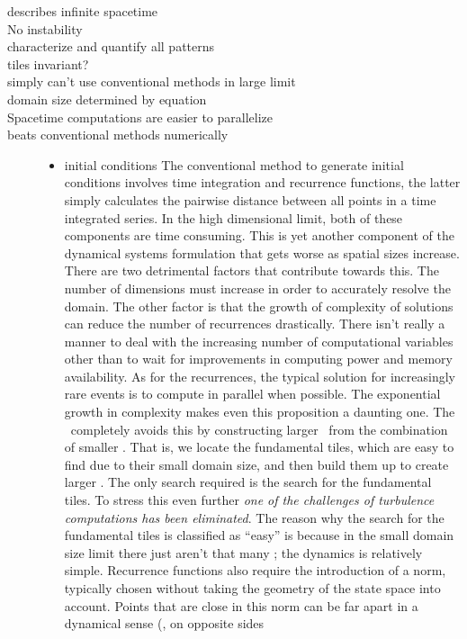 \begin{itemize}
{\begin{description}
\item[describes infinite spacetime]
\item[No instability]
\item[characterize and quantify all patterns]
\item[tiles invariant?]
\item[simply can't use conventional methods in large limit]
\item[domain size determined by equation]
\item[Spacetime computations are easier to parallelize]
\item[beats conventional methods numerically]
    \begin{itemize}
    \item initial conditions
    The conventional method to generate initial conditions
involves time integration and recurrence functions, the latter simply
calculates the pairwise distance between all points in a time integrated
series.%
In the high dimensional limit, both
of these components are time consuming. This is yet another
component of the dynamical systems formulation that gets worse
as spatial sizes increase. There are two detrimental factors
that contribute towards this. The number of dimensions must increase
in order to accurately resolve the domain. The other factor is that
the growth of complexity of solutions can reduce the number of recurrences
drastically. There isn't really a manner to deal with the increasing
number of computational variables other than to wait for improvements
in computing power and memory availability. As for the recurrences, the
typical solution for increasingly rare events is to compute in parallel when
possible. The exponential growth in complexity makes even this proposition
a daunting one.
The \spt\ completely avoids this by constructing larger \twots\
from the combination of smaller \twots. That is,
we locate the fundamental tiles, which are easy to find due to their small
domain size, and then build them up to create larger \twots. The only
search required is the search for the fundamental tiles. To stress
this even further \textit{one of the challenges of turbulence
computations has been eliminated}. The reason
why the search for the fundamental tiles is classified as ``easy'' is because
in the small domain size limit there just aren't that many \twots; the dynamics
is relatively simple.
Recurrence functions also require the introduction of a norm,
typically chosen without taking the geometry of the state space into account.
Points that are close in this norm can be far apart in a dynamical sense (\ie, on opposite sides

\end{itemize}
\end{description}}
\end{itemize}

